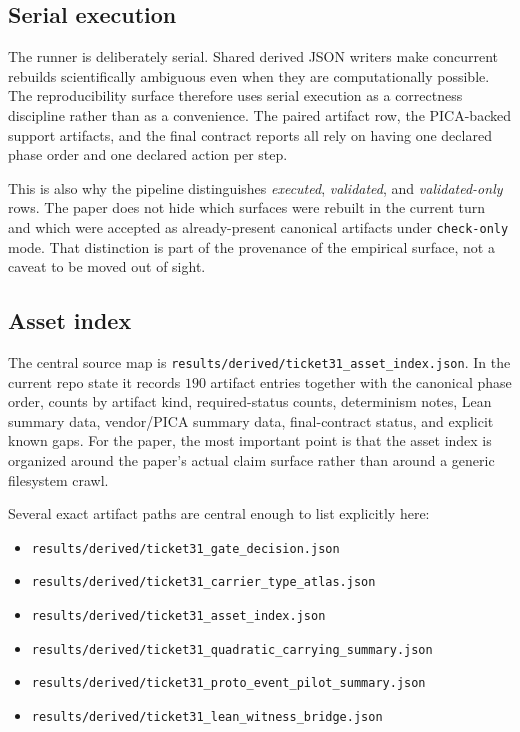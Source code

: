 \documentclass[11pt]{article}
\theoremstyle{definition}
\begin{document}
\subsection{Serial execution}

The runner is deliberately serial. Shared derived JSON writers make concurrent rebuilds
scientifically ambiguous even when they are computationally possible. The reproducibility
surface therefore uses serial execution as a correctness discipline rather than as a
convenience. The paired artifact row, the PICA-backed support artifacts, and the final
contract reports all rely on having one declared phase order and one declared action per
step.

This is also why the pipeline distinguishes \emph{executed}, \emph{validated}, and
\emph{validated-only} rows. The paper does not hide which surfaces were rebuilt in the
current turn and which were accepted as already-present canonical artifacts under
\texttt{check-only} mode. That distinction is part of the provenance of the empirical
surface, not a caveat to be moved out of sight.

\subsection{Asset index}

The central source map is
\nolinkurl{results/derived/ticket31_asset_index.json}. In the current repo state it records
\(190\) artifact entries together with the canonical phase order, counts by artifact kind,
required-status counts, determinism notes, Lean summary data, vendor/PICA summary data,
final-contract status, and explicit known gaps. For the paper, the most important point is
that the asset index is organized around the paper's actual claim surface rather than
around a generic filesystem crawl.

Several exact artifact paths are central enough to list explicitly here:
\begin{itemize}[leftmargin=*]
\item \nolinkurl{results/derived/ticket31_gate_decision.json}
\item \nolinkurl{results/derived/ticket31_carrier_type_atlas.json}
\item \nolinkurl{results/derived/ticket31_asset_index.json}
\item \nolinkurl{results/derived/ticket31_quadratic_carrying_summary.json}
\item \nolinkurl{results/derived/ticket31_proto_event_pilot_summary.json}
\item \nolinkurl{results/derived/ticket31_lean_witness_bridge.json}
\end{itemize}
\end{document}
